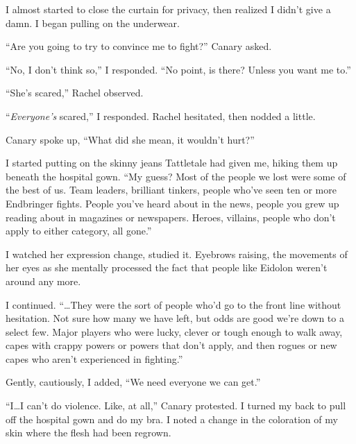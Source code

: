 I almost started to close the curtain for privacy, then realized I didn't give a damn.  I began pulling on the underwear.



``Are you going to try to convince me to fight?'' Canary asked.



``No, I don't think so,'' I responded.  ``No point, is there?  Unless you want me to.''



``She's scared,'' Rachel observed.



``\emph{Everyone's} scared,'' I responded.  Rachel hesitated, then nodded a little.



Canary spoke up, ``What did she mean, it wouldn't hurt?''



I started putting on the skinny jeans Tattletale had given me, hiking them up beneath the hospital gown.  ``My guess?  Most of the people we lost were some of the best of us.  Team leaders, brilliant tinkers, people who've seen ten or more Endbringer fights.  People you've heard about in the news, people you grew up reading about in magazines or newspapers.  Heroes, villains, people who don't apply to either category, all gone.''



I watched her expression change, studied it.  Eyebrows raising, the movements of her eyes as she mentally processed the fact that people like Eidolon weren't around any more.



I continued.  ``\ldots{}They were the sort of people who'd go to the front line without hesitation.  Not sure how many we have left, but odds are good we're down to a select few.  Major players who were lucky, clever or tough enough to walk away, capes with crappy powers or powers that don't apply, and then rogues or new capes who aren't experienced in fighting.''



Gently, cautiously, I added, ``We need everyone we can get.''



``I\ldots I can't do violence.  Like, at all,'' Canary protested.  I turned my back to pull off the hospital gown and do my bra.  I noted a change in the coloration of my skin where the flesh had been regrown.



